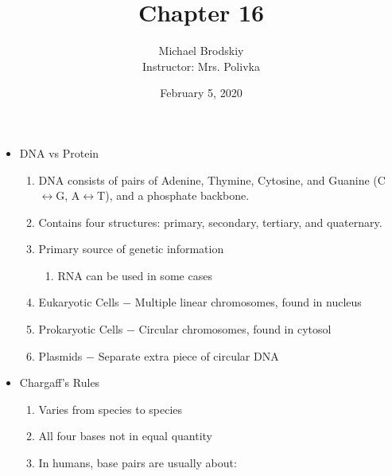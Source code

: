 \documentclass[12pt]{article}
\title{Chapter 16}
\date{February 5, 2020}
\author{Michael Brodskiy\\ \small Instructor: Mrs. Polivka}
\begin{document}
\maketitle

\begin{itemize}

  \item DNA vs Protein

    \begin{enumerate}

      \item DNA consists of pairs of Adenine, Thymine, Cytosine, and Guanine (C$\leftrightarrow$G, A$\leftrightarrow$T), and a phosphate backbone.

      \item Contains four structures: primary, secondary, tertiary, and quaternary.

      \item Primary source of genetic information

        \begin{enumerate}

          \item RNA can be used in some cases

        \end{enumerate}

      \item Eukaryotic Cells $-$ Multiple linear chromosomes, found in nucleus

      \item Prokaryotic Cells $-$ Circular chromosomes, found in cytosol

      \item Plasmids $-$ Separate extra piece of circular DNA

    \end{enumerate}

  \item Chargaff's Rules

    \begin{enumerate}

      \item Varies from species to species

      \item All four bases not in equal quantity

      \item In humans, base pairs are usually about:

        \begin{enumerate}


\end{enumerate}
\end{enumerate}
\end{itemize}
\end{document}
